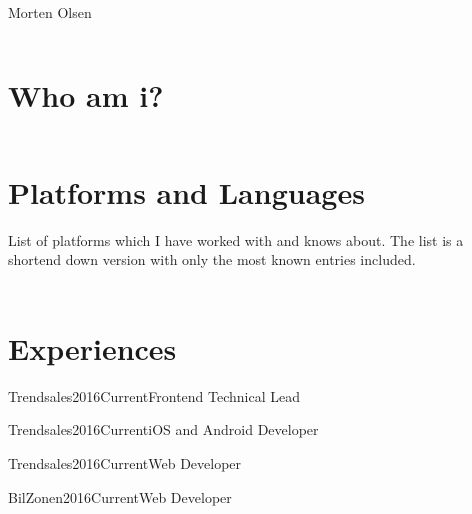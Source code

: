 
\begin{cvtitle}{Morten Olsen}
\end{cvtitle}

\begin{columns}
	\section*{Who am i?}
	\kant[1]
\end{columns}

\section*{Platforms and Languages}
List of platforms which I have worked with and knows about. The list is a shortend down version with only the most known entries included.\\\\
\begin{cvskills}
\end{cvskills}

\section*{Experiences}

\begin{cvexp}{Trendsales}{2016}{Current}{Frontend Technical Lead}
	\kant[1]
\end{cvexp}

\begin{cvexp}{Trendsales}{2016}{Current}{iOS and Android Developer}
	\kant[1]
\end{cvexp}

\begin{cvexp}{Trendsales}{2016}{Current}{Web Developer}
	\kant[1]
\end{cvexp}

\begin{cvexp}{BilZonen}{2016}{Current}{Web Developer}
\kant[1]
\end{cvexp}

